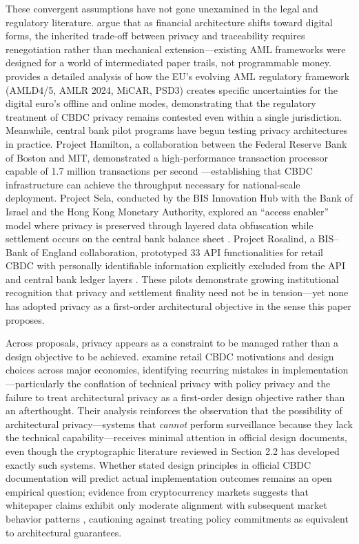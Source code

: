\documentclass[11pt]{article}
\begin{document}
These convergent assumptions have not gone unexamined in the legal and regulatory literature. \citet{SoanaArruda2024} argue that as financial architecture shifts toward digital forms, the inherited trade-off between privacy and traceability requires renegotiation rather than mechanical extension---existing AML frameworks were designed for a world of intermediated paper trails, not programmable money. \citet{Minto2024} provides a detailed analysis of how the EU's evolving AML regulatory framework (AMLD4/5, AMLR 2024, MiCAR, PSD3) creates specific uncertainties for the digital euro's offline and online modes, demonstrating that the regulatory treatment of CBDC privacy remains contested even within a single jurisdiction. Meanwhile, central bank pilot programs have begun testing privacy architectures in practice. Project Hamilton, a collaboration between the Federal Reserve Bank of Boston and MIT, demonstrated a high-performance transaction processor capable of 1.7 million transactions per second \citep{Lovejoy2023Hamilton}---establishing that CBDC infrastructure can achieve the throughput necessary for national-scale deployment. Project Sela, conducted by the BIS Innovation Hub with the Bank of Israel and the Hong Kong Monetary Authority, explored an ``access enabler'' model where privacy is preserved through layered data obfuscation while settlement occurs on the central bank balance sheet \citep{ProjectSela2023}. Project Rosalind, a BIS--Bank of England collaboration, prototyped 33 API functionalities for retail CBDC with personally identifiable information explicitly excluded from the API and central bank ledger layers \citep{ProjectRosalind2023}. These pilots demonstrate growing institutional recognition that privacy and settlement finality need not be in tension---yet none has adopted privacy as a first-order architectural objective in the sense this paper proposes.

Across proposals, privacy appears as a constraint to be managed rather than a design objective to be achieved. \citet{goodell2025cbdc} examine retail CBDC motivations and design choices across major economies, identifying recurring mistakes in implementation---particularly the conflation of technical privacy with policy privacy and the failure to treat architectural privacy as a first-order design objective rather than an afterthought. Their analysis reinforces the observation that the possibility of architectural privacy---systems that \textit{cannot} perform surveillance because they lack the technical capability---receives minimal attention in official design documents, even though the cryptographic literature reviewed in Section 2.2 has developed exactly such systems. Whether stated design principles in official CBDC documentation will predict actual implementation outcomes remains an open empirical question; evidence from cryptocurrency markets suggests that whitepaper claims exhibit only moderate alignment with subsequent market behavior patterns \citep{farzulla2025whitepaper}, cautioning against treating policy commitments as equivalent to architectural guarantees.
\end{document}
